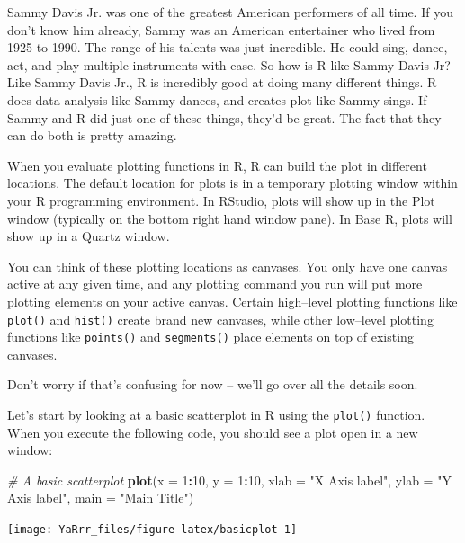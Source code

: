 \documentclass[]{book}
\newenvironment{Shaded}{\begin{snugshade}}{\end{snugshade}}
\newcommand{\KeywordTok}[1]{\textcolor[rgb]{0.13,0.29,0.53}{\textbf{#1}}}
\newcommand{\DataTypeTok}[1]{\textcolor[rgb]{0.13,0.29,0.53}{#1}}
\newcommand{\DecValTok}[1]{\textcolor[rgb]{0.00,0.00,0.81}{#1}}
\newcommand{\StringTok}[1]{\textcolor[rgb]{0.31,0.60,0.02}{#1}}
\newcommand{\CommentTok}[1]{\textcolor[rgb]{0.56,0.35,0.01}{\textit{#1}}}
\newcommand{\OperatorTok}[1]{\textcolor[rgb]{0.81,0.36,0.00}{\textbf{#1}}}
\newcommand{\NormalTok}[1]{#1}
\theoremstyle{definition}
\theoremstyle{definition}
\theoremstyle{remark}
\begin{document}
Sammy Davis Jr. was one of the greatest American performers of all time.
If you don't know him already, Sammy was an American entertainer who
lived from 1925 to 1990. The range of his talents was just incredible.
He could sing, dance, act, and play multiple instruments with ease. So
how is R like Sammy Davis Jr? Like Sammy Davis Jr., R is incredibly good
at doing many different things. R does data analysis like Sammy dances,
and creates plot like Sammy sings. If Sammy and R did just one of these
things, they'd be great. The fact that they can do both is pretty
amazing.

When you evaluate plotting functions in R, R can build the plot in
different locations. The default location for plots is in a temporary
plotting window within your R programming environment. In RStudio, plots
will show up in the Plot window (typically on the bottom right hand
window pane). In Base R, plots will show up in a Quartz window.

You can think of these plotting locations as canvases. You only have one
canvas active at any given time, and any plotting command you run will
put more plotting elements on your active canvas. Certain high--level
plotting functions like \texttt{plot()} and \texttt{hist()} create brand
new canvases, while other low--level plotting functions like
\texttt{points()} and \texttt{segments()} place elements on top of
existing canvases.

Don't worry if that's confusing for now -- we'll go over all the details
soon.

Let's start by looking at a basic scatterplot in R using the
\texttt{plot()} function. When you execute the following code, you
should see a plot open in a new window:

\begin{Shaded}
\begin{Highlighting}[]
\CommentTok{# A basic scatterplot}
\KeywordTok{plot}\NormalTok{(}\DataTypeTok{x =} \DecValTok{1}\OperatorTok{:}\DecValTok{10}\NormalTok{,}
     \DataTypeTok{y =} \DecValTok{1}\OperatorTok{:}\DecValTok{10}\NormalTok{,}
     \DataTypeTok{xlab =} \StringTok{"X Axis label"}\NormalTok{,}
     \DataTypeTok{ylab =} \StringTok{"Y Axis label"}\NormalTok{,}
     \DataTypeTok{main =} \StringTok{"Main Title"}\NormalTok{)}
\end{Highlighting}
\end{Shaded}

\begin{center}\texttt{[image: YaRrr\_files/figure-latex/basicplot-1]} \end{center}
\end{document}

